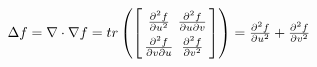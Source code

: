 \documentclass[12pt]{article}
\begin{document}
  

$
\arraycolsep=1.6pt
\def\arraystretch{1.5}
\Delta f = \nabla \cdot \nabla f 
=  
\mathop{ tr }{\left(\left[\begin{array}{cc}
\frac{\partial^2 f}{\partial u^2} & \frac{\partial^2 f}{\partial u \partial v} \\
\frac{\partial^2 f}{\partial v \partial u} & \frac{\partial^2 f}{\partial v^2} 
\end{array}
\right]\right)}
=
\frac{\partial^2 f}{\partial u^2} + \frac{\partial ^2 f}{\partial v^2}
$
\end{document}
